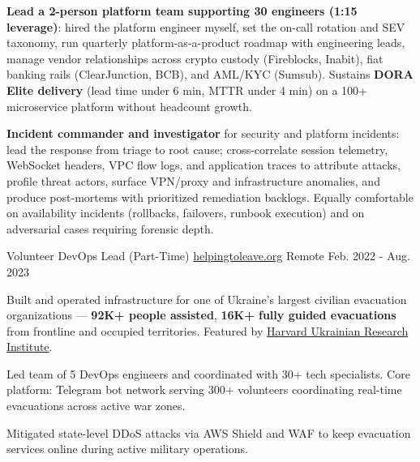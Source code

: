 \documentclass[10pt, a4paper]{awesome-cv}
\begin{document}
\begin{cventries}
{\begin{cvitems}
        \item {\textbf{Lead a 2-person platform team supporting 30 engineers (1:15 leverage)}: hired the platform engineer myself, set the on-call rotation and SEV taxonomy, run quarterly platform-as-a-product roadmap with engineering leads, manage vendor relationships across crypto custody (Fireblocks, Inabit), fiat banking rails (ClearJunction, BCB), and AML/KYC (Sumsub). Sustains \textbf{DORA Elite delivery} (lead time under 6 min, MTTR under 4 min) on a 100+ microservice platform without headcount growth.}
        \item {\textbf{Incident commander and investigator} for security and platform incidents: lead the response from triage to root cause; cross-correlate session telemetry, WebSocket headers, VPC flow logs, and application traces to attribute attacks, profile threat actors, surface VPN/proxy and infrastructure anomalies, and produce post-mortems with prioritized remediation backlogs. Equally comfortable on availability incidents (rollbacks, failovers, runbook execution) and on adversarial cases requiring forensic depth.}
      \end{cvitems}
    }

  \cventry
    {Volunteer DevOps Lead (Part-Time)}
    {\href{https://helpingtoleave.org}{helpingtoleave.org}}
    {Remote}
    {Feb. 2022 - Aug. 2023}
    {
      \begin{cvitems}
        \item {Built and operated infrastructure for one of Ukraine's largest civilian evacuation organizations --- \textbf{92K+ people assisted}, \textbf{16K+ fully guided evacuations} from frontline and occupied territories. Featured by \href{https://huri.harvard.edu/news/uchitelka-rufina-bazlova-tetiana-kulykivska-russias-war-against-ukraine-bilingual}{Harvard Ukrainian Research Institute}.}
        \item {Led team of 5 DevOps engineers and coordinated with 30+ tech specialists. Core platform: Telegram bot network serving 300+ volunteers coordinating real-time evacuations across active war zones.}
        \item {Mitigated state-level DDoS attacks via AWS Shield and WAF to keep evacuation services online during active military operations.}
      \end{cvitems}
    }


\end{cventries}
\end{document}
